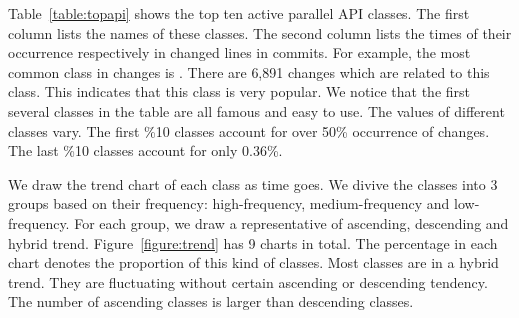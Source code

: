 %



Table~\ref{table:topapi} shows the top ten active parallel API classes. The first column lists the names of these classes. The second column lists the times of their occurrence respectively in changed lines in commits. For example, the most common class in changes is . There are 6,891 changes which are related to this class. This indicates that this class is very popular. We notice that the first several classes in the table are all famous and easy to use. The values of different classes vary. The first \%10 classes account for over 50\% occurrence of changes. The last \%10 classes account for only 0.36\%.

We draw the trend chart of each class as time goes. We divive the classes into 3 groups based on their frequency: high-frequency, medium-frequency and low-frequency. For each group, we draw a representative of ascending, descending and hybrid trend. Figure~\ref{figure:trend} has 9 charts in total. The percentage in each chart denotes the proportion of this kind of classes. Most classes are in a hybrid trend. They are fluctuating without certain ascending or descending tendency. The number of ascending classes is larger than descending classes.




